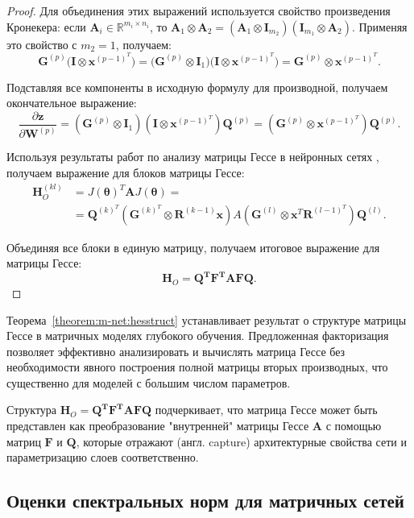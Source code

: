 \begin{proof}
Для объединения этих выражений используется свойство произведения Кронекера: если $\mathbf{A}_i \in \mathbb{R}^{m_i \times n_i}$, то $\mathbf{A}_1 \otimes \mathbf{A}_2 = (\mathbf{A}_1 \otimes \mathbf{I}_{m_2})(\mathbf{I}_{m_1} \otimes \mathbf{A}_2)$.
Применяя это свойство с $m_2 = 1$, получаем:
\[
    \mathbf{G}^{(p)}\big(\mathbf{I} \otimes \mathbf{x}^{(p-1)^T}\big) = \big(\mathbf{G}^{(p)} \otimes \mathbf{I}_1\big)\big(\mathbf{I} \otimes \mathbf{x}^{(p-1)^T}\big) = \mathbf{G}^{(p)} \otimes \mathbf{x}^{(p-1)^T}.
\]

Подставляя все компоненты в исходную формулу для производной, получаем окончательное выражение:
\[
    \frac{\partial\mathbf{z}}{\partial\mathbf{W}^{(p)}} = (\mathbf{G}^{(p)} \otimes \mathbf{I}_1)(\mathbf{I} \otimes \mathbf{x}^{(p-1)^T})\mathbf{Q}^{(p)} = (\mathbf{G}^{(p)} \otimes \mathbf{x}^{(p-1)^T})\mathbf{Q}^{(p)}.
\]

Используя результаты работ по анализу матрицы Гессе в нейронных сетях \cite{singh2023hessianperspectivenatureconvolutional}, получаем выражение для блоков матрицы Гессе:
\begin{align}
    \mathbf{H}_O^{(kl)} &= J(\boldsymbol{\theta})^T \mathbf{A} J(\boldsymbol{\theta}) = \\
    &= \mathbf{Q}^{(k)^T}(\mathbf{G}^{(k)^T} \otimes \mathbf{R}^{(k-1)}\mathbf{x})A(\mathbf{G}^{(l)} \otimes \mathbf{x}^T\mathbf{R}^{(l-1)^T})\mathbf{Q}^{(l)}.
\end{align}

Объединяя все блоки в единую матрицу, получаем итоговое выражение для матрицы Гессе:
\[
    \mathbf{H}_O = \mathbf{Q}^\mathbf{T}\mathbf{F}^\mathbf{T}\mathbf{A}\mathbf{F}\mathbf{Q}.
\]
\end{proof}

Теорема~\ref{theorem:m-net:hesstruct} устанавливает результат о структуре матрицы Гессе в матричных моделях глубокого обучения. Предложенная факторизация позволяет эффективно анализировать и вычислять матрица Гессе без необходимости явного построения полной матрицы вторых производных, что существенно для моделей с большим числом параметров.

Структура $\mathbf{H}_O = \mathbf{Q}^\mathbf{T}\mathbf{F}^\mathbf{T}\mathbf{A}\mathbf{F}\mathbf{Q}$ подчеркивает, что матрица Гессе может быть представлен как преобразование "внутренней" матрицы Гессе $\mathbf{A}$ с помощью матриц $\mathbf{F}$ и $\mathbf{Q}$, которые отражают (англ. capture) архитектурные свойства сети и параметризацию слоев соответственно.

\subsection{Оценки спектральных норм для матричных сетей}


